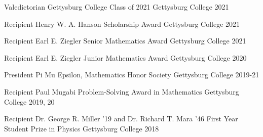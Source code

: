 




\begin{cvhonors}

\cvhonor
{Valedictorian} %
{Gettysburg College Class of 2021} %
{Gettysburg College} %
{2021} %


\cvhonor
{Recipient} %
{Henry W. A. Hanson Scholarship Award} %
{Gettysburg College} %
{2021} %


\cvhonor
{Recipient} %
{Earl E. Ziegler Senior Mathematics Award} %
{Gettysburg College} %
{2021} %


\cvhonor
{Recipient} %
{Earl E. Ziegler Junior Mathematics Award} %
{Gettysburg College} %
{2020} %



\cvhonor
{President} %
{Pi Mu Epsilon, Mathematics Honor Society} %
{Gettysburg College} %
{2019-21} %


\cvhonor
{Recipient} %
{Paul Mugabi Problem-Solving Award in Mathematics} %
{Gettysburg College} %
{2019, 20} %


\cvhonor
{Recipient} %
{Dr. George R. Miller '19 and Dr. Richard T. Mara '46 First Year Student Prize in Physics} %
{Gettysburg College} %
{2018} %


\end{cvhonors}
